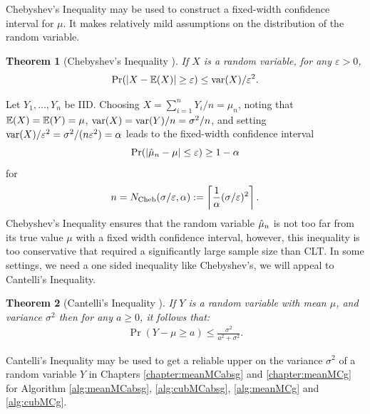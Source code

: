 \documentclass{iitthesis}
\newtheorem{theorem}{Theorem}[section]
\theoremstyle{definition}
\begin{document}

Chebyshev's Inequality may be used to construct a fixed-width confidence interval for $\mu$.  It makes relatively mild assumptions on the distribution of the random variable.

\begin{theorem}[Chebyshev's Inequality {\cite[6.1.c]{LB10}}] \label{ChebyThm}
If $X$ is a random variable, for any $\varepsilon>0$, 
$$\Pr(\left \lvert X-\mathbb{E}(X) \right \rvert \ge \varepsilon) \le  \operatorname{var}(X)/\varepsilon^2.$$
\end{theorem}
Let $Y_1, \ldots, Y_n$ be IID. Choosing $X=\sum_{i=1}^n Y_i/n = \mu_n$, noting that $\mathbb{E}(X) = \mathbb{E}(Y) = \mu$, $\operatorname{var}(X) = \operatorname{var}(Y)/n = \sigma^2/n$, and setting $\operatorname{var}(X)/\varepsilon^2=\sigma^2/(n\varepsilon^2) = \alpha$ leads to the fixed-width confidence interval 
\[
\Pr(\left \lvert \hat{\mu}_{n}-\mu \right \rvert \le \varepsilon) \ge 1- \alpha 
\]
 for 
 \begin{align}\label{NCheb}
n=N_{\text{Cheb}}(\sigma/\varepsilon,\alpha):= \left \lceil \frac{1}{\alpha} (\sigma/\varepsilon)^2\right \rceil.
 \end{align}
 Chebyshev's Inequality ensures that the random variable $\hat{\mu}_n$ is not too far from its true value $\mu$ with a fixed width confidence interval, however, this inequality is too conservative that required a significantly large sample size than CLT. In some settings, we need a one sided inequality like Chebyshev's, we will appeal to Cantelli's Inequality.
 

\begin{theorem}[Cantelli's Inequality {\cite[6.1.e]{LB10}}]\label{CanThm} If $Y$ is a random variable with mean $\mu$, and variance $\sigma^2$ then for any $a \geq 0$, it follows that: 
\begin{align}
\Pr(Y-\mu \ge a) \le  \frac{\sigma^2}{a^2+\sigma^2}.
\end{align}
\end{theorem}
Cantelli's Inequality may be used to get a reliable upper on the variance $\sigma^2$ of a random variable $Y$ in Chapters \ref{chapter:meanMCabsg} and \ref{chapter:meanMCg} for Algorithm \ref{alg:meanMCabsg}, \ref{alg:cubMCabsg}, \ref{alg:meanMCg} and \ref{alg:cubMCg}.

\end{document}
